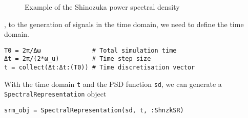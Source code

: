 \begin{figure}
\centering
{}
\caption{Example of the Shinozuka power spectral density}
\end{figure}




, to the generation of signals in the time domain, we need to define the time domain.




\begin{verbatim}
T0 = 2π/Δω              # Total simulation time
Δt = 2π/(2*ω_u)         # Time step size
t = collect(Δt:Δt:(T0)) # Time discretisation vector
\end{verbatim}



With the time domain \texttt{t} and the PSD function \texttt{sd}, we can generate a \texttt{SpectralRepresentation} object




\begin{verbatim}
srm_obj = SpectralRepresentation(sd, t, :ShnzkSR)
\end{verbatim}


